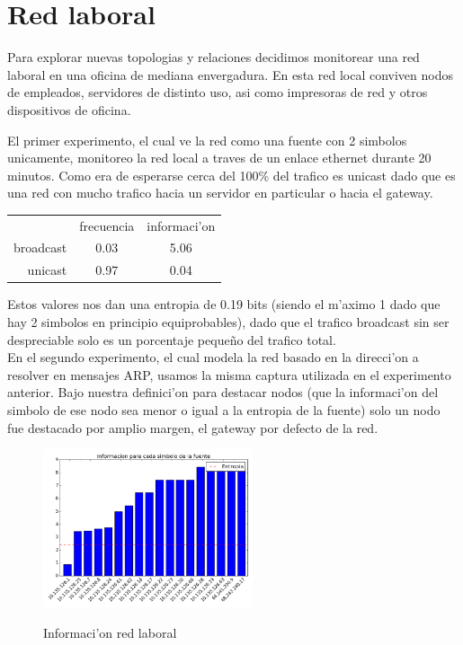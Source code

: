 \section{Red laboral}
Para explorar nuevas topologias y relaciones decidimos monitorear una red laboral en una oficina de mediana envergadura. En esta
red local conviven nodos de empleados, servidores de distinto uso, asi como impresoras de red y otros dispositivos de oficina. 

El primer experimento, el cual ve la red como una fuente con 2 simbolos unicamente, monitoreo la red local a traves de un enlace
ethernet durante 20 minutos. Como era de esperarse cerca del 100\% del trafico es unicast dado que es una red con mucho trafico
hacia un servidor en particular o hacia el gateway.

\begin{tabular}{ r|c|c| }
\multicolumn{1}{r}{}
 &  \multicolumn{1}{c}{frecuencia}
 & \multicolumn{1}{c}{informaci'on} \\
\cline{2-3}
broadcast & 0.03 & 5.06 \\
\cline{2-3}
unicast & 0.97 & 0.04 \\
\cline{2-3}
\end{tabular}
 
 Estos valores nos dan una entropia de 0.19 bits (siendo el m'aximo 1 dado que hay 2 simbolos en principio equiprobables),
 dado que el trafico broadcast sin ser despreciable solo es un porcentaje peque\~no del trafico total.\\
 
En el segundo experimento, el cual modela la red basado en la direcci'on a resolver en mensajes ARP, usamos la misma captura
utilizada en el experimento anterior. Bajo nuestra definici'on para destacar nodos (que la informaci'on del simbolo de ese nodo 
sea menor o igual a la entropia de la fuente) solo un nodo fue destacado por amplio margen, el gateway por defecto de la red.\\

\begin{figure}[!h]
\centering
\caption{Informaci'on red laboral}
\includegraphics[width=0.55\textwidth]{red2_info}
 \label{fig:red2info}
\end{figure}

